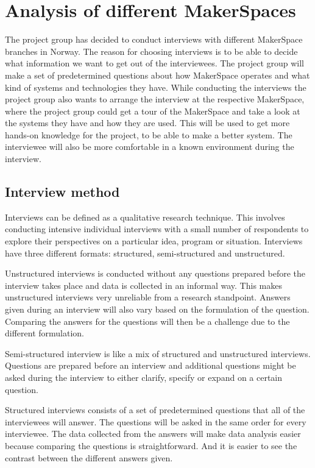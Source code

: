 \section{Analysis of different MakerSpaces}
The project group has decided to conduct interviews with different MakerSpace branches in Norway. The reason for choosing interviews is to be able to decide what information we want to get out of the interviewees. The project group will make a set of predetermined questions about how MakerSpace operates and what kind of systems and technologies they have. While conducting the interviews the project group also wants to arrange the interview at the respective MakerSpace, where the project group could get a tour of the MakerSpace and take a look at the systems they have and how they are used. This will be used to get more hands-on knowledge for the project, to be able to make a better system. The interviewee will also be more comfortable in a known environment during the interview.

\subsection{Interview method}

Interviews can be defined as a qualitative research technique. This involves conducting intensive individual interviews with a small number of respondents to explore their perspectives on a particular idea, program or situation.\cite{Interview-Methods} Interviews have three different formats: structured, semi-structured and unstructured.

Unstructured interviews is conducted without any questions prepared before the interview takes place and data is collected in an informal way. This makes unstructured interviews very unreliable from a research standpoint. Answers given during an interview will also vary based on the formulation of the question. Comparing the answers for the questions will then be a challenge due to the different formulation.

Semi-structured interview is like a mix of structured and unstructured interviews. Questions are prepared before an interview and additional questions might be asked during the interview to either clarify, specify or expand on a certain question. 

Structured interviews consists of a set of predetermined questions that all of the interviewees will answer. The questions will be asked in the same order for every interviewee. The data collected from the answers will make data analysis easier because comparing the questions is straightforward. And it is easier to see the contrast between the different answers given.

